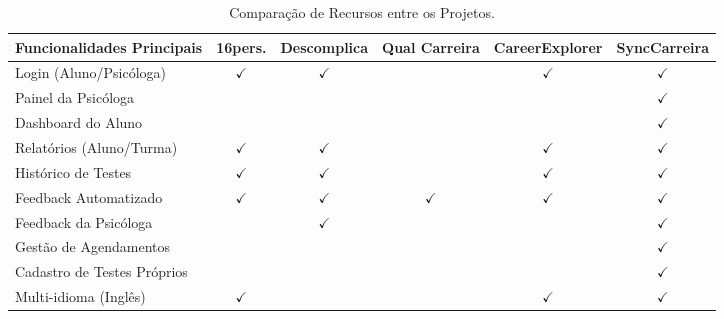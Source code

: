 \begin{table}[H]
\ABNTEXfontereduzida
\caption[Comparação de Recursos entre os Projetos]{Comparação de Recursos entre os Projetos.}
\label{quadro-comparativo}
\begin{tabular}{|p{4cm}|c|c|c|c|c|}
\hline
\textbf{Funcionalidades Principais} & \textbf{16pers.} & \textbf{Descomplica} & \textbf{Qual Carreira} & \textbf{CareerExplorer} & \textbf{SyncCarreira} \\
\hline
Login (Aluno/Psicóloga) & $\checkmark$ & $\checkmark$ &  & $\checkmark$ & $\checkmark$ \\
\hline
Painel da Psicóloga &  &  &  &  & $\checkmark$ \\
\hline
Dashboard do Aluno &  &  &  &  & $\checkmark$ \\
\hline
Relatórios (Aluno/Turma) & $\checkmark$ & $\checkmark$ &  & $\checkmark$ & $\checkmark$ \\
\hline
Histórico de Testes & $\checkmark$ & $\checkmark$ &  & $\checkmark$ & $\checkmark$ \\
\hline
Feedback Automatizado & $\checkmark$ & $\checkmark$ & $\checkmark$ & $\checkmark$ & $\checkmark$ \\
\hline
Feedback da Psicóloga &  & $\checkmark$ &  &  & $\checkmark$ \\
\hline
Gestão de Agendamentos &  &  &  &  & $\checkmark$ \\
\hline
Cadastro de Testes Próprios &  &  &  &  & $\checkmark$ \\
\hline
Multi-idioma (Inglês) & $\checkmark$ &  &  & $\checkmark$ & $\checkmark$ \\
\hline
\end{tabular}
\end{table}
